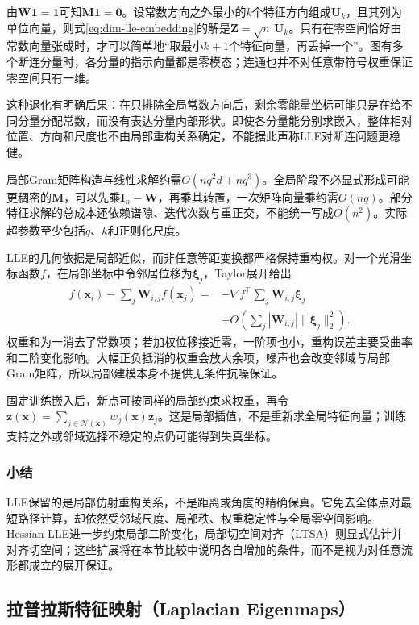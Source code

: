 由$\bm{W}\bm{1}=\bm{1}$可知$\bm{M}\bm{1}=\bm{0}$。设常数方向之外最小的$k$个特征方向组成$\bm{U}_k$，且其列为单位向量，则式\eqref{eq:dim-lle-embedding}的解是$\bm{Z}=\sqrt n\,\bm{U}_k$。只有在零空间恰好由常数向量张成时，才可以简单地“取最小$k+1$个特征向量，再丢掉一个”。图有多个断连分量时，各分量的指示向量都是零模态；连通也并不对任意带符号权重保证零空间只有一维。

这种退化有明确后果：在只排除全局常数方向后，剩余零能量坐标可能只是在给不同分量分配常数，而没有表达分量内部形状。即使各分量能分别求嵌入，整体相对位置、方向和尺度也不由局部重构关系确定，不能据此声称LLE对断连问题更稳健。

局部Gram矩阵构造与线性求解约需$O(nq^2d+nq^3)$。全局阶段不必显式形成可能更稠密的$\bm{M}$，可以先乘$\bm{I}_n-\bm{W}$，再乘其转置，一次矩阵向量乘约需$O(nq)$。部分特征求解的总成本还依赖谱隙、迭代次数与重正交，不能统一写成$O(n^2)$。实际超参数至少包括$q$、$k$和正则化尺度。

LLE的几何依据是局部近似，而非任意等距变换都严格保持重构权。对一个光滑坐标函数$f$，在局部坐标中令邻居位移为$\bm{\xi}_j$，Taylor展开给出
\[
  \begin{aligned}
    f(\bm{x}_i)-\sum_j\bm{W}_{i,j}f(\bm{x}_j)
    ={}&-\nabla f^{\top}\sum_j\bm{W}_{i,j}\bm{\xi}_j\\
       &+O\left(\sum_j|\bm{W}_{i,j}|
                  \lVert\bm{\xi}_j\rVert_2^2\right).
  \end{aligned}
\]
权重和为一消去了常数项；若加权位移接近零，一阶项也小，重构误差主要受曲率和二阶变化影响。大幅正负抵消的权重会放大余项，噪声也会改变邻域与局部Gram矩阵，所以局部建模本身不提供无条件抗噪保证。

固定训练嵌入后，新点可按同样的局部约束求权重，再令$\bm{z}(\bm{x})=\sum_{j\in\mathcal{N}(\bm{x})}w_j(\bm{x})\bm{z}_j$。这是局部插值，不是重新求全局特征向量；训练支持之外或邻域选择不稳定的点仍可能得到失真坐标。

\subsubsection{小结}

LLE保留的是局部仿射重构关系，不是距离或角度的精确保真。它免去全体点对最短路径计算，却依然受邻域尺度、局部秩、权重稳定性与全局零空间影响。Hessian LLE进一步约束局部二阶变化，局部切空间对齐（LTSA）则显式估计并对齐切空间；这些扩展将在本节比较中说明各自增加的条件，而不是视为对任意流形都成立的展开保证。

\subsection{拉普拉斯特征映射（Laplacian Eigenmaps）}
\label{sec:dim-le}

